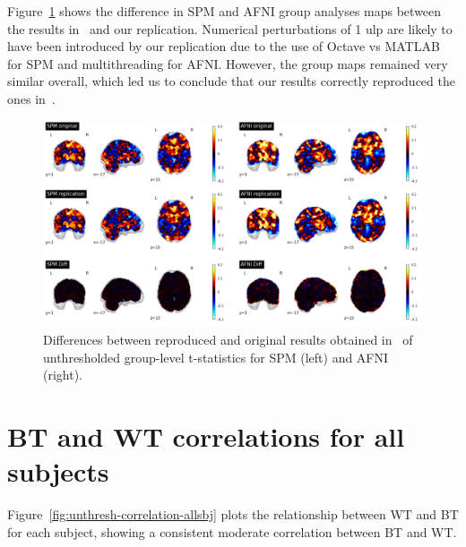 \documentclass[11pt,onecolumn]{article}
\begin{document}
Figure~\ref{fig:replication-diff} shows the difference in SPM and AFNI
group analyses maps between the results in~\cite{bowring2019exploring} and
our replication. Numerical perturbations of 1 ulp are likely to have been
introduced by our replication due to the use of Octave vs MATLAB for SPM
and multithreading for AFNI. However, the group maps remained very similar
overall, which led us to conclude that our results correctly reproduced 
the ones in~\cite{bowring2019exploring}.
\begin{figure}[ht]
  \includegraphics[width=\textwidth]{figures/replication-diffs.png}
  \caption{Differences between reproduced and original results obtained in~\cite{bowring2019exploring} 
  of unthresholded group-level t-statistics for SPM (left) and AFNI (right).}
  \label{fig:replication-diff}
\end{figure}

\section{BT and WT correlations for all subjects}
\label{sec:supp-subjects}

Figure~\ref{fig:unthresh-correlation-allsbj} plots the relationship between
WT and BT for each subject, showing a consistent moderate correlation between BT and
WT.
\end{document}
